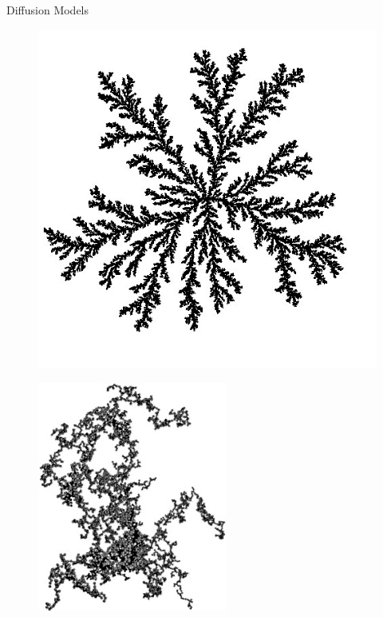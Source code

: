 \documentclass{beamer}
\begin{document}
\begin{frame}{Diffusion Models}
\begin{itemize}
      \begin{figure}
\centering
\begin{minipage}{.5\textwidth}
  \centering
  \includegraphics[width=.55\linewidth]{DLA.jpg}
  \label{fig1:}
\end{minipage}%
\begin{minipage}{.5\textwidth}
  \centering
  \includegraphics[width=.45\linewidth]{DLCA.jpg}
  \label{fig2:}
\end{minipage}
\end{figure}
  \end{itemize}
\end{frame}

\end{document}
